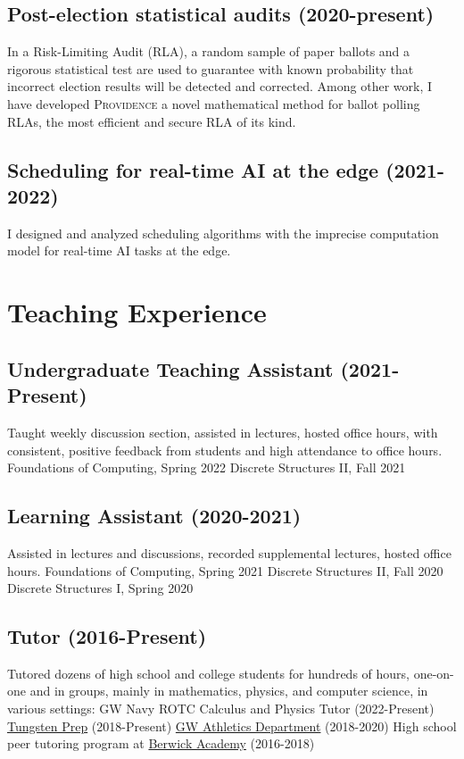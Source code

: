 \documentclass[letterpaper]{article}
\newcommand{\Providence}{\textsc{Providence}\xspace}
\begin{document}
\subsection*{Post-election statistical audits (2020-present)}
In a Risk-Limiting Audit (RLA), a random sample of paper ballots and a rigorous statistical test are used to guarantee with known probability that incorrect election results will be detected and corrected.
Among other work, I have developed \Providence a novel mathematical method for ballot polling RLAs, the most efficient and secure RLA of its kind.

\subsection*{Scheduling for real-time AI at the edge (2021-2022)}
I designed and analyzed scheduling algorithms with the imprecise computation model for real-time AI tasks at the edge. 

\section*{Teaching Experience}
\subsection*{Undergraduate Teaching Assistant (2021-Present)}
Taught weekly discussion section, assisted in lectures, hosted office hours, with consistent, positive feedback from students and high attendance to office hours.
\subitem
Foundations of Computing, Spring 2022
\subitem
Discrete Structures II, Fall 2021
\subsection*{Learning Assistant (2020-2021)}
Assisted in lectures and discussions, recorded supplemental lectures, hosted office hours.
\subitem
Foundations of Computing, Spring 2021
\subitem
Discrete Structures II, Fall 2020
\subitem
Discrete Structures I, Spring 2020
\subsection*{Tutor (2016-Present)}
Tutored dozens of high school and college students for hundreds of hours, one-on-one and in groups, mainly in mathematics, physics, and computer science, in various settings:
\subitem 
GW Navy ROTC Calculus and Physics Tutor (2022-Present)
\subitem
\href{https://www.tungstenprep.com/}{Tungsten Prep} (2018-Present) 
\subitem
\href{https://gwsports.com/sports/2018/7/23/school-bio-academic-support-tutor-info-html.aspx}{GW Athletics Department} (2018-2020) 
\subitem 
High school peer tutoring program at \href{https://www.berwickacademy.org/}{Berwick Academy} (2016-2018)
\end{document}
